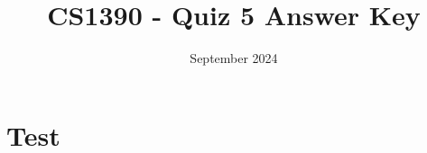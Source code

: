 \documentclass{article}
\title{CS1390 - Quiz 5 Answer Key}
\date{September 2024}
\begin{document}
\maketitle

\section{Test}
\end{document}

